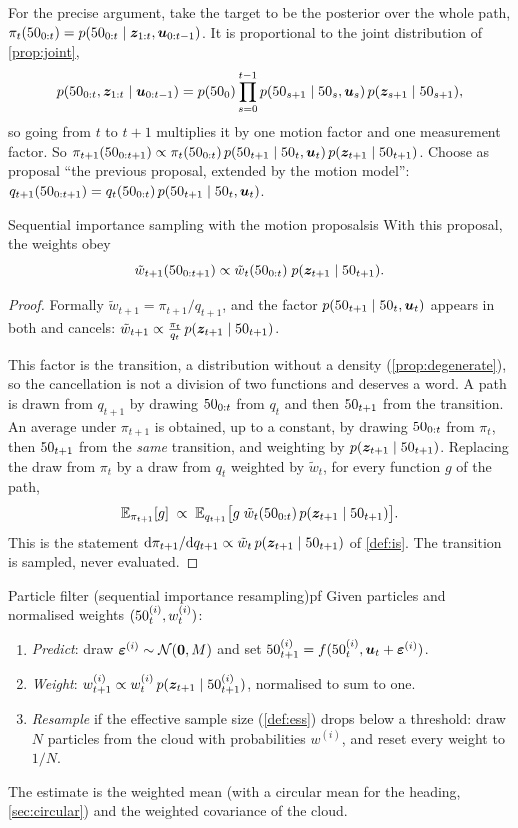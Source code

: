 For the precise argument, take the target to be the posterior over the
whole path,
$\pi_t(50_{0:t})=p(50_{0:t}\mid\bm{z}_{1:t},\bm{u}_{0:t-1})$. It is proportional to the joint distribution of \cref{prop:joint},
\[
  p(50_{0:t},\bm{z}_{1:t}\mid\bm{u}_{0:t-1})=p(50_0)\prod_{s=0}^{t-1}
  p(50_{s+1}\mid50_s,\bm{u}_s)\,p(\bm{z}_{s+1}\mid50_{s+1}),
\]
so going from $t$ to $t+1$ multiplies it by one motion factor and one
measurement factor. So
$\pi_{t+1}(50_{0:t+1})\propto\pi_t(50_{0:t})\,p(50_{t+1}\mid50_t,\bm{u}_t)\,
p(\bm{z}_{t+1}\mid50_{t+1})$. Choose as proposal ``the previous proposal,
extended by the motion model'':
$q_{t+1}(50_{0:t+1})=q_t(50_{0:t})\,p(50_{t+1}\mid50_t,\bm{u}_t)$.

\begin{proposition}{Sequential importance sampling with the motion proposal}{sis}
With this proposal, the weights obey
\[
  \tilde w_{t+1}(50_{0:t+1})\propto\tilde w_t(50_{0:t})\;
  p(\bm{z}_{t+1}\mid50_{t+1}).
\]
\end{proposition}

\begin{proof}
Formally $\tilde w_{t+1}=\pi_{t+1}/q_{t+1}$, and the factor
$p(50_{t+1}\mid50_t,\bm{u}_t)$ appears in both and cancels:
$\tilde w_{t+1}\propto\frac{\pi_t}{q_t}\,p(\bm{z}_{t+1}\mid50_{t+1})$.

This factor is the transition, a distribution without a density
(\cref{prop:degenerate}), so the cancellation is not a division of two
functions and deserves a word. A path is drawn from $q_{t+1}$ by drawing
$50_{0:t}$ from $q_t$ and then $50_{t+1}$ from the transition. An average
under $\pi_{t+1}$ is obtained, up to a constant, by drawing $50_{0:t}$ from
$\pi_t$, then $50_{t+1}$ from the \emph{same} transition, and weighting by
$p(\bm{z}_{t+1}\mid50_{t+1})$. Replacing the draw from $\pi_t$ by a draw from
$q_t$ weighted by $\tilde w_t$, for every function $g$ of the path,
\[
  \mathbb{E}_{\pi_{t+1}}[g]\;\propto\;\mathbb{E}_{q_{t+1}}\bigl[g\;\tilde w_t(50_{0:t})\,
  p(\bm{z}_{t+1}\mid50_{t+1})\bigr].
\]
This is the statement
$\mathrm d\pi_{t+1}/\mathrm dq_{t+1}\propto\tilde w_t\,
p(\bm{z}_{t+1}\mid50_{t+1})$ of \cref{def:is}. The transition is sampled,
never evaluated.
\end{proof}

\begin{definition}{Particle filter (sequential importance resampling)}{pf}
Given particles and normalised weights $(50_t^{(i)},w_t^{(i)})$:
\begin{enumerate}[nosep]
\item \emph{Predict}: draw $\bm{\varepsilon}^{(i)}\sim\mathcal{N}(\bm{0},M)$ and set
  $50_{t+1}^{(i)}=f(50_t^{(i)},\bm{u}_t+\bm{\varepsilon}^{(i)})$.
\item \emph{Weight}: $w_{t+1}^{(i)}\propto w_t^{(i)}\,
  p(\bm{z}_{t+1}\mid50_{t+1}^{(i)})$, normalised to sum to one.
\item \emph{Resample} if the effective sample size (\cref{def:ess}) drops
  below a threshold: draw $N$ particles from the cloud with probabilities
  $w^{(i)}$, and reset every weight to $1/N$.
\end{enumerate}
The estimate is the weighted mean (with a circular mean for the heading,
\cref{sec:circular})
and the weighted covariance of the cloud.
\end{definition}

